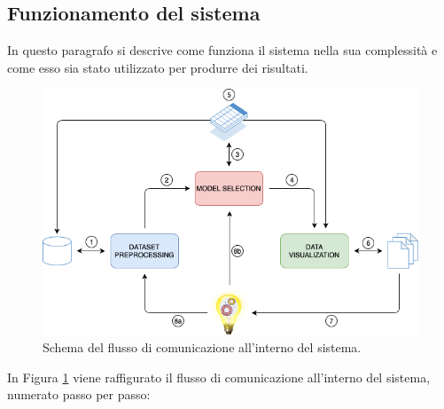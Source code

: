 \documentclass[12pt]{report}
\theoremstyle{definition}
\begin{document}
\subsection{Funzionamento del sistema}
In questo paragrafo si descrive come funziona il sistema nella sua complessità e come esso sia stato utilizzato per produrre dei risultati.
\begin{figure}[!ht]
    \centering
    \includegraphics[scale=0.6]{images/cycle.png}
    \caption{Schema del flusso di comunicazione all'interno del sistema.}
    \label{cycle}
\end{figure}
In Figura \ref{cycle} viene raffigurato il flusso di comunicazione all'interno del sistema, numerato passo per passo: 
\end{document}
